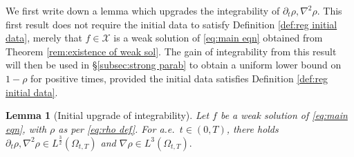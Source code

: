 \documentclass[11pt,a4paper,reqno]{amsart}
\newtheorem{lemma}[prop]{Lemma}
\theoremstyle{remark}
\theoremstyle{definition}
\numberwithin{equation}{section}
\begin{document}
We first write down a lemma which upgrades the integrability of $\partial_t \rho,\nabla^2 \rho$. This first result does not require the initial data to satisfy Definition \ref{def:reg initial data}, merely that $f \in \mathcal{X}$ is a weak solution of \eqref{eq:main eqn} obtained from Theorem \ref{rem:existence of weak sol}. The gain of integrability from this result will then be used in \S \ref{subsec:strong parab} to obtain a uniform lower bound on $1-\rho$ for positive times, provided the initial data satisfies Definition \ref{def:reg initial data}. 


\begin{lemma}[Initial upgrade of integrability]\label{lem:heat eq rho in L3/2}
Let $f$ be a weak solution of \eqref{eq:main eqn}, with $\rho$ as per \eqref{eq:rho def}. For a.e.~$t \in (0,T)$, there holds $\partial_t \rho, \nabla^2 \rho \in L^{\frac{3}{2}}(\Omega_{t,T})$ and $\nabla \rho \in L^{3}(\Omega_{t,T}).$
\end{lemma}
\end{document}
